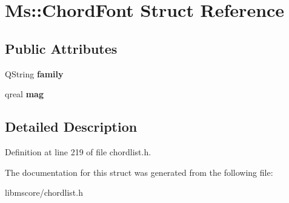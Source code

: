 \hypertarget{struct_ms_1_1_chord_font}{}\section{Ms\+:\+:Chord\+Font Struct Reference}
\label{struct_ms_1_1_chord_font}
\subsection*{Public Attributes}
\begin{DoxyCompactItemize}
\item 
\mbox{\label{struct_ms_1_1_chord_font_a0690e7cb1e0d133ee6932085058d02f8}} 
Q\+String {\bfseries family}
\item 
\mbox{\label{struct_ms_1_1_chord_font_ad98e5e77119c6bf5513408c9097df5c6}} 
qreal {\bfseries mag}
\end{DoxyCompactItemize}


\subsection{Detailed Description}


Definition at line 219 of file chordlist.\+h.



The documentation for this struct was generated from the following file\+:\begin{DoxyCompactItemize}
\item 
libmscore/chordlist.\+h\end{DoxyCompactItemize}
